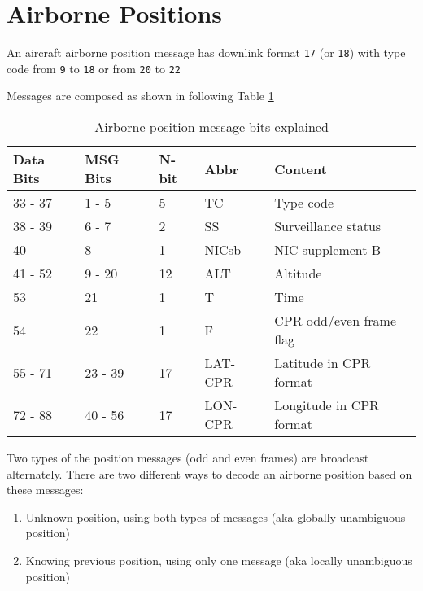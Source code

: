 \section{Airborne Positions}\label{airborne-positions}

An aircraft airborne position message has downlink format \texttt{17} (or \texttt{18}) with type code from \texttt{9} to \texttt{18} or from \texttt{20} to \texttt{22}

Messages are composed as shown in following Table \ref{tb:adsb-pos-bits}

\begin{table}[!ht]
\centering
\caption{Airborne position message bits explained}
\label{tb:adsb-pos-bits}
\begin{tabular}{@{}lllll@{}}
\toprule
Data Bits & MSG Bits & N-bit & Abbr    & Content                 \\ \midrule
33 - 37   & 1 - 5    & 5     & TC      & Type code               \\
38 - 39   & 6 - 7    & 2     & SS      & Surveillance status     \\
40        & 8        & 1     & NICsb   & NIC supplement-B        \\
41 - 52   & 9 - 20   & 12    & ALT     & Altitude                \\
53        & 21       & 1     & T       & Time                    \\
54        & 22       & 1     & F       & CPR odd/even frame flag \\
55 - 71   & 23 - 39  & 17    & LAT-CPR & Latitude in CPR format  \\
72 - 88   & 40 - 56  & 17    & LON-CPR & Longitude in CPR format \\ \bottomrule
\end{tabular}
\end{table}

Two types of the position messages (odd and even frames) are broadcast alternately. There are two different ways to decode an airborne position based on these messages:

\begin{enumerate}
\def\labelenumi{\arabic{enumi}.}

\item
  Unknown position, using both types of messages (aka globally unambiguous position)
\item
  Knowing previous position, using only one message (aka locally unambiguous position)
\end{enumerate}

